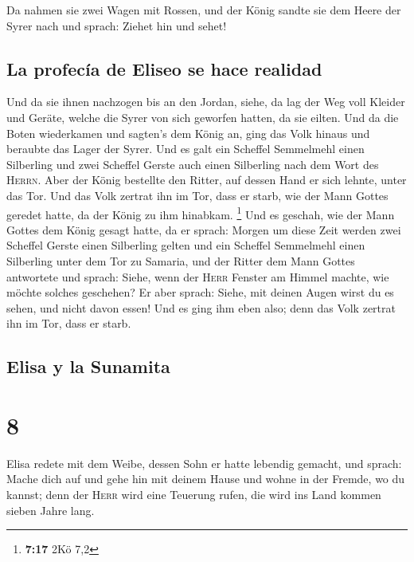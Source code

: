  Da nahmen sie zwei Wagen mit Rossen, und der König
sandte sie dem Heere der Syrer nach und sprach: Ziehet hin und sehet!

\hypertarget{la-profecuxeda-de-eliseo-se-hace-realidad}{%
\subsection{La profecía de Eliseo se hace
realidad}\label{la-profecuxeda-de-eliseo-se-hace-realidad}}

 Und da sie ihnen nachzogen bis an den Jordan, siehe, da
lag der Weg voll Kleider und Geräte, welche die Syrer von sich geworfen
hatten, da sie eilten. Und da die Boten wiederkamen und sagten's dem
König an,  ging das Volk hinaus und beraubte das Lager
der Syrer. Und es galt ein Scheffel Semmelmehl einen Silberling und zwei
Scheffel Gerste auch einen Silberling nach dem Wort des \textsc{Herrn}.
 Aber der König bestellte den Ritter, auf dessen Hand er
sich lehnte, unter das Tor. Und das Volk zertrat ihn im Tor, dass er
starb, wie der Mann Gottes geredet hatte, da der König zu ihm hinabkam.
\footnote{\textbf{7:17} 2Kö 7,2}  Und es geschah, wie der
Mann Gottes dem König gesagt hatte, da er sprach: Morgen um diese Zeit
werden zwei Scheffel Gerste einen Silberling gelten und ein Scheffel
Semmelmehl einen Silberling unter dem Tor zu Samaria, 
und der Ritter dem Mann Gottes antwortete und sprach: Siehe, wenn der
\textsc{Herr} Fenster am Himmel machte, wie möchte solches geschehen? Er
aber sprach: Siehe, mit deinen Augen wirst du es sehen, und nicht davon
essen!  Und es ging ihm eben also; denn das Volk zertrat
ihn im Tor, dass er starb.

\hypertarget{elisa-y-la-sunamita}{%
\subsection{Elisa y la Sunamita}\label{elisa-y-la-sunamita}}

\hypertarget{section-7}{%
\section{8}\label{section-7}}

 Elisa redete mit dem Weibe, dessen Sohn er hatte lebendig
gemacht, und sprach: Mache dich auf und gehe hin mit deinem Hause und
wohne in der Fremde, wo du kannst; denn der \textsc{Herr} wird eine
Teuerung rufen, die wird ins Land kommen sieben Jahre lang.


